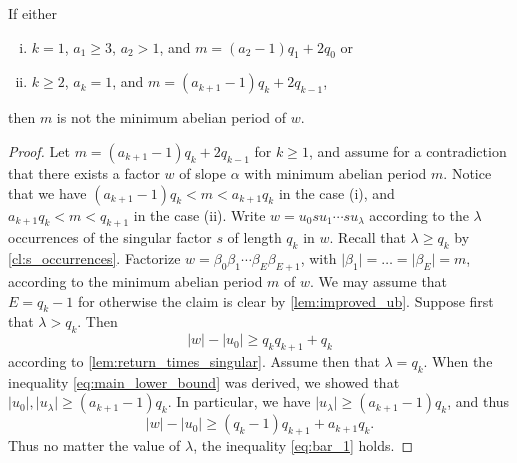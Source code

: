 \documentclass[a4paper,fleqn]{article}
\providecommand{\abs}[1]{\lvert#1\rvert}
\begin{document}
  \begin{lemma}\label{lem:cases_2_3}
    If either
    \begin{enumerate}[(i)]
      \item $k = 1$, $a_1 \geq 3$, $a_2 > 1$, and $m = (a_2 - 1)q_1 + 2q_0$ or
      \item $k \geq 2$, $a_k = 1$, and $m = (a_{k+1} - 1)q_k + 2q_{k-1}$,
    \end{enumerate}
    then $m$ is not the minimum abelian period of $w$.
  \end{lemma}
  \begin{proof}
    Let $m = (a_{k+1} - 1)q_k + 2q_{k-1}$ for $k \geq 1$, and assume for a contradiction that there exists a factor $w$
    of slope $\alpha$ with minimum abelian period $m$. Notice that we have $(a_{k+1} - 1)q_k < m < a_{k+1}q_k$ in the
    case (i), and $a_{k+1}q_k < m < q_{k+1}$ in the case (ii). Write $w = u_0 s u_1 \dotsm s u_\lambda$ according to
    the $\lambda$ occurrences of the singular factor $s$ of length $q_k$ in $w$. Recall that $\lambda \geq q_k$ by
    \autoref{cl:s_occurrences}. Factorize $w = \beta_0 \beta_1 \dotsm \beta_E \beta_{E+1}$, with
    $\abs{\beta_1} = \ldots = \abs{\beta_E} = m$, according to the minimum abelian period $m$ of $w$. We may assume
    that $E = q_k - 1$ for otherwise the claim is clear by \autoref{lem:improved_ub}. Suppose first that
    $\lambda > q_k$. Then
    \begin{equation*}
      \abs{w} - \abs{u_0} \geq q_k q_{k+1} + q_k
    \end{equation*}
    according to \autoref{lem:return_times_singular}. Assume then that $\lambda = q_k$. When the inequality
    \eqref{eq:main_lower_bound} was derived, we showed that $\abs{u_0}, \abs{u_\lambda} \geq (a_{k+1} - 1)q_k$.
    In particular, we have $\abs{u_\lambda} \geq (a_{k+1} - 1)q_k$, and thus
    \begin{equation}\label{eq:bar_1}
      \abs{w} - \abs{u_0} \geq (q_k - 1)q_{k+1} + a_{k+1}q_k.
    \end{equation}
    Thus no matter the value of $\lambda$, the inequality \eqref{eq:bar_1} holds.


\end{proof}
\end{document}
